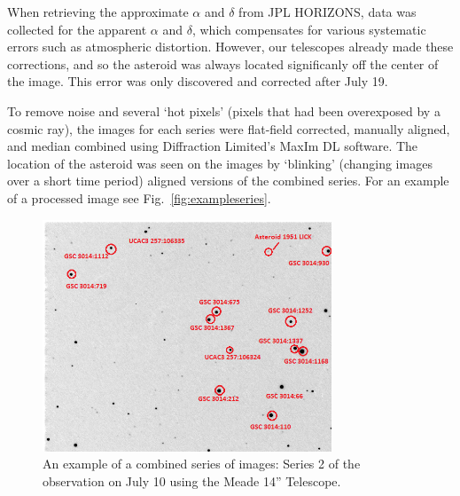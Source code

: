 \documentclass[12pt,journal,compsoc]{IEEEtran}
\begin{document}
When retrieving the approximate $\alpha$ and $\delta$ from JPL HORIZONS, data was collected for the apparent $\alpha$ and $\delta$, which compensates for various systematic errors such as atmospheric distortion.
However, our telescopes already made these corrections, and so the asteroid was always located significanly off the center of the image.
This error was only discovered and corrected after July 19. 

To remove noise and several `hot pixels' (pixels that had been overexposed by a cosmic ray), the images for each series were flat-field corrected, manually aligned, and median combined using Diffraction Limited's MaxIm DL software.
The location of the asteroid was seen on the images by `blinking' (changing images over a short time period) aligned versions of the combined series.
For an example of a processed image see Fig.~\ref{fig:exampleseries}.

\begin{figure}[!t]
\centering
\includegraphics[width=3.4in]{Jul10Series2.png}
\caption{An example of a combined series of images: Series 2 of the observation on July 10 using the Meade 14'' Telescope.\label{fig:exampleseries}}
\label{fig_sim}
\end{figure}
\end{document}
